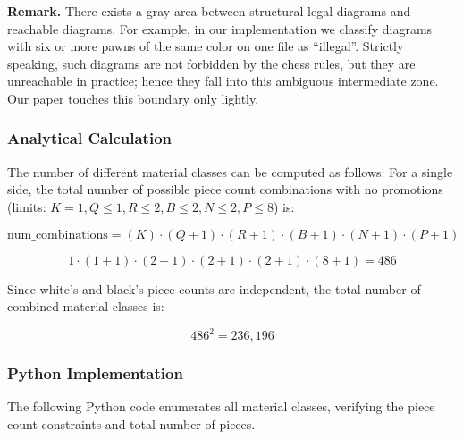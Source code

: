 \documentclass[12pt]{article}
\begin{document}
\noindent
\textbf{Remark.}  
There exists a gray area between structural legal diagrams and reachable diagrams.  
For example, in our implementation we classify diagrams with six or more pawns of the same color on one file as ``illegal''. Strictly speaking, such diagrams are not forbidden by the chess rules, but they are unreachable in practice; hence they fall into this ambiguous intermediate zone. Our paper touches this boundary only lightly.


\subsubsection{Analytical Calculation}

The number of different material classes can be computed as follows: 
For a single side, the total number of possible piece count combinations with no promotions 
(limits: $K = 1, Q \le 1, R \le 2, B \le 2, N \le 2, P \le 8$) is:

\[
\text{num\_combinations} = (K) \cdot (Q + 1) \cdot (R + 1) \cdot (B + 1) \cdot (N + 1) \cdot (P + 1)
\]

\[
1 \cdot (1 + 1) \cdot (2 + 1) \cdot (2 + 1) \cdot (2 + 1) \cdot (8 + 1) = 486
\]

Since white's and black's piece counts are independent, the total number of
combined material classes is:

\[
486^2 = 236{,}196
\]

\subsubsection{Python Implementation}

The following Python code enumerates all material classes, verifying the piece count constraints and total number of pieces.
\end{document}
